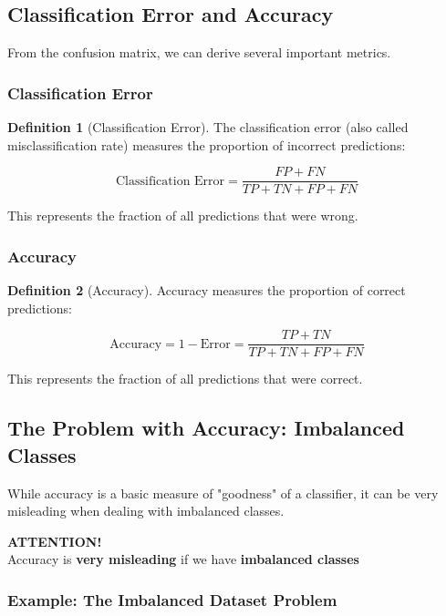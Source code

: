 \documentclass[11pt,a4paper]{article}
\theoremstyle{definition}
\newtheorem{definition}{Definition}[section]
\theoremstyle{plain}
\theoremstyle{remark}
\begin{document}
\subsection{Classification Error and Accuracy}

From the confusion matrix, we can derive several important metrics.

\subsubsection{Classification Error}

\begin{definition}[Classification Error]
The classification error (also called misclassification rate) measures the proportion of incorrect predictions:

\[
\text{Classification Error} = \frac{FP + FN}{TP + TN + FP + FN}
\]

This represents the fraction of all predictions that were wrong.
\end{definition}

\subsubsection{Accuracy}

\begin{definition}[Accuracy]
Accuracy measures the proportion of correct predictions:

\[
\text{Accuracy} = 1 - \text{Error} = \frac{TP + TN}{TP + TN + FP + FN}
\]

This represents the fraction of all predictions that were correct.
\end{definition}

\subsection{The Problem with Accuracy: Imbalanced Classes}

While accuracy is a basic measure of "goodness" of a classifier, it can be very misleading when dealing with imbalanced classes.

\begin{center}
\colorbox{red!20}{\parbox{0.9\textwidth}{
\centering
\textbf{ATTENTION!}\\[0.2cm]
Accuracy is \textbf{very misleading} if we have \textbf{imbalanced classes}
}}
\end{center}

\subsubsection{Example: The Imbalanced Dataset Problem}
\end{document}
